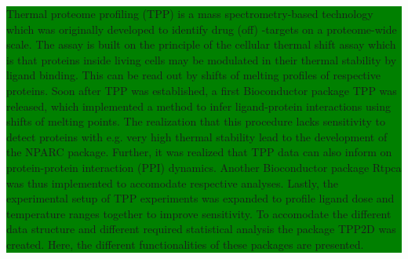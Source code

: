 \documentclass{article}
\newcommand{\hcode}[2][lgray]{{\ttfamily\color{vdgray}\colorbox{#1}{#2}}}
\begin{document}
\noindent
\colorbox{green}{
  \noindent
  \begin{minipage}[t]{\textwidth}
    \vspace{.15cm}
    \large 
      Thermal proteome profiling (TPP) is a mass spectrometry-based 
      technology which was originally developed to identify drug (off)
      -targets on a proteome-wide scale. The assay is built on the principle
      of the cellular thermal shift assay which is that proteins inside living
      cells may be modulated in their thermal stability by ligand binding.
      This can be read out by shifts of melting profiles of respective proteins. 
      Soon after TPP was established, a first Bioconductor package \hcode{TPP} 
      was released, which implemented a method to infer ligand-protein interactions
      using shifts of melting points. The realization that this procedure 
      lacks sensitivity to detect proteins with e.g. very high thermal stability lead 
      to the development of the \hcode{NPARC} package. 
      Further, it was realized that TPP data can also inform on protein-protein 
      interaction (PPI) dynamics. Another Bioconductor package \hcode{Rtpca} was thus implemented
      to accomodate respective analyses. 
      Lastly, the experimental setup of TPP experiments was expanded to profile ligand
      dose and temperature ranges together to improve sensitivity. To accomodate the 
      different data structure and different required statistical analysis the package
      \hcode{TPP2D} was created. Here, the different functionalities of these packages are presented. 
      
    \vspace{0.1cm}
  \end{minipage}
}
\vspace{-1cm}
\end{document}
